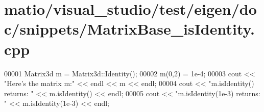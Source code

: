 \hypertarget{matio_2visual__studio_2test_2eigen_2doc_2snippets_2_matrix_base__is_identity_8cpp_source}{}\section{matio/visual\+\_\+studio/test/eigen/doc/snippets/\+Matrix\+Base\+\_\+is\+Identity.cpp}
\label{matio_2visual__studio_2test_2eigen_2doc_2snippets_2_matrix_base__is_identity_8cpp_source}

\begin{DoxyCode}
00001 Matrix3d m = Matrix3d::Identity();
00002 m(0,2) = 1e-4;
00003 cout << \textcolor{stringliteral}{"Here's the matrix m:"} << endl << m << endl;
00004 cout << \textcolor{stringliteral}{"m.isIdentity() returns: "} << m.isIdentity() << endl;
00005 cout << \textcolor{stringliteral}{"m.isIdentity(1e-3) returns: "} << m.isIdentity(1e-3) << endl;
\end{DoxyCode}
